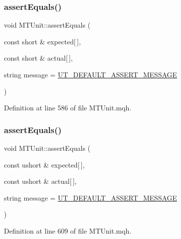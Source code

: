\subsubsection{\texorpdfstring{assert\+Equals()}{assertEquals()}\hspace{0.1cm}{\footnotesize\ttfamily [18/28]}}
{\footnotesize\ttfamily void M\+T\+Unit\+::assert\+Equals (\begin{DoxyParamCaption}\item[{const short \&}]{expected\mbox{[}$\,$\mbox{]},  }\item[{const short \&}]{actual\mbox{[}$\,$\mbox{]},  }\item[{string}]{message = {\ttfamily \mbox{\hyperlink{_m_t_unit_8mqh_a96f5d62188d09039ebc3f443c9120e39}{U\+T\+\_\+\+D\+E\+F\+A\+U\+L\+T\+\_\+\+A\+S\+S\+E\+R\+T\+\_\+\+M\+E\+S\+S\+A\+GE}}} }\end{DoxyParamCaption})}



Definition at line 586 of file M\+T\+Unit.\+mqh.

\mbox{\label{class_m_t_unit_a8ddce74ac19c972b7cacefc21522a1d1}} 
\subsubsection{\texorpdfstring{assert\+Equals()}{assertEquals()}\hspace{0.1cm}{\footnotesize\ttfamily [19/28]}}
{\footnotesize\ttfamily void M\+T\+Unit\+::assert\+Equals (\begin{DoxyParamCaption}\item[{const ushort \&}]{expected\mbox{[}$\,$\mbox{]},  }\item[{const ushort \&}]{actual\mbox{[}$\,$\mbox{]},  }\item[{string}]{message = {\ttfamily \mbox{\hyperlink{_m_t_unit_8mqh_a96f5d62188d09039ebc3f443c9120e39}{U\+T\+\_\+\+D\+E\+F\+A\+U\+L\+T\+\_\+\+A\+S\+S\+E\+R\+T\+\_\+\+M\+E\+S\+S\+A\+GE}}} }\end{DoxyParamCaption})}



Definition at line 609 of file M\+T\+Unit.\+mqh.

\mbox{\label{class_m_t_unit_a0cd5f3f0134dc20e0cf9150987db8276}} 
